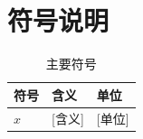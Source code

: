 \section{符号说明}
\begin{table}[H]\centering\caption{主要符号}\label{tab:symbols}
\begin{tabular}{lll}\toprule 符号 & 含义 & 单位\\\midrule $x$ & [含义] & [单位]\\\bottomrule\end{tabular}
\end{table}
